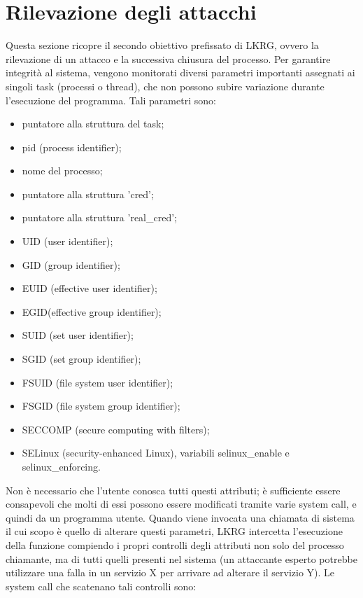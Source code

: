 \section{Rilevazione degli attacchi}

Questa sezione ricopre il secondo obiettivo prefissato di LKRG, ovvero la rilevazione di un attacco e la successiva chiusura del processo. Per garantire integrità al sistema, vengono monitorati diversi parametri importanti assegnati ai singoli task (processi o thread), che non possono subire variazione durante l'esecuzione del programma. Tali parametri sono:

\begin{itemize}
\item puntatore alla struttura del task;
\item pid (process identifier);
\item nome del processo;
\item puntatore alla struttura 'cred';
\item puntatore alla struttura 'real\_cred';
\item UID (user identifier);
\item GID (group identifier);
\item EUID (effective user identifier);
\item EGID(effective group identifier);
\item SUID (set user identifier);
\item SGID (set group identifier);
\item FSUID (file system user identifier);
\item FSGID (file system group identifier);
\item SECCOMP (secure computing with filters);
\item SELinux (security-enhanced Linux), variabili selinux\_enable e selinux\_enforcing.
\end{itemize}

Non è necessario che l'utente conosca tutti questi attributi; è sufficiente essere consapevoli che molti di essi possono essere modificati tramite varie system call, e quindi da un programma utente. Quando viene invocata una chiamata di sistema il cui scopo è quello di alterare questi parametri, LKRG intercetta l'esecuzione della funzione compiendo i propri controlli degli attributi non solo del processo chiamante, ma di tutti quelli presenti nel sistema (un attaccante esperto potrebbe utilizzare una falla in un servizio X per arrivare ad alterare il servizio Y). Le system call che scatenano tali controlli sono:

